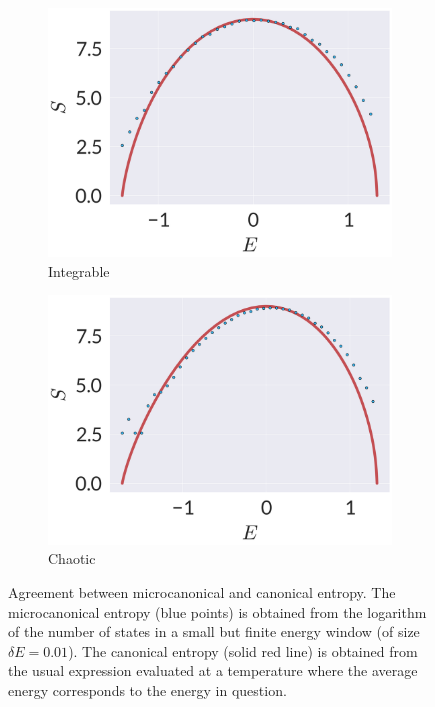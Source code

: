 \begin{figure}
	\centering
\begin{subfigure}{0.5\textwidth}
	\centering
\includegraphics[width=\columnwidth]{figures/chapter1/entropy-i.png}
\caption{Integrable}
\end{subfigure}%
\begin{subfigure}{0.5\textwidth}
	\centering
\includegraphics[width=\columnwidth]{figures/chapter1/entropy-ni.png}
\caption{Chaotic}
\end{subfigure}
\caption{Agreement between microcanonical and canonical entropy. The microcanonical entropy (blue points) is obtained from the logarithm of the number of states in a small but finite energy window (of size $\delta E=0.01$). The canonical entropy (solid red line) is obtained from the usual expression evaluated at a temperature where the average energy corresponds to the energy in question.}
\label{fig:entropies}
\end{figure}


